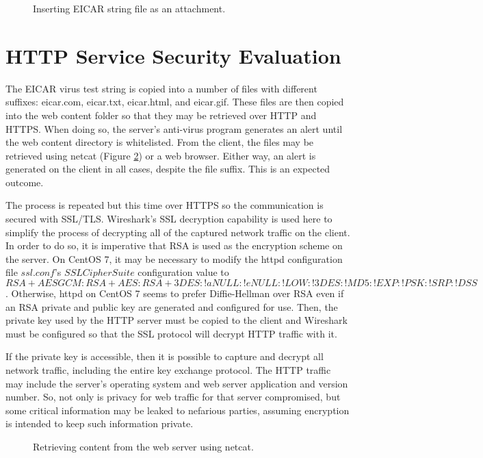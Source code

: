 \documentclass[10pt,conference]{IEEEtran}
\begin{document}
\begin{figure}
\begin{mdframed}

\caption{Inserting EICAR string file as an attachment.}
\label{fig:attachment}
\end{mdframed}
\end{figure}

\section{HTTP Service Security Evaluation}
The EICAR virus test string is copied into a number of files with different suffixes: eicar.com, 
eicar.txt, eicar.html, and eicar.gif. These files are then copied into the web content folder so
that they may be retrieved over HTTP and HTTPS. When doing so, the server's anti-virus 
program generates an alert until the web content directory is whitelisted. From the client, the files may be retrieved
using netcat (Figure \ref{fig:httpnetcat}) or a web browser.  Either way, an alert is generated on the client in all cases, despite
the file suffix.  This is an expected outcome.

The process is repeated but this time over HTTPS so the communication is secured with SSL/TLS.
Wireshark's SSL decryption capability is used here to simplify the process of decrypting all of
the captured network traffic on the client. In order to do so, it is imperative that RSA is used
as the encryption scheme on the server. On CentOS 7, it may be necessary to modify the httpd configuration
file $ssl.conf$'s $SSLCipherSuite$ configuration value to $RSA+AESGCM:RSA+AES:RSA+3DES:!aNULL:!eNULL:!LOW:!3DES:!MD5:!EXP:!PSK:!SRP:!DSS$.
Otherwise, httpd on CentOS 7 seems to prefer Diffie-Hellman over RSA even if an RSA private and public
key are generated and configured for use. Then, the private key used by the HTTP server must be copied 
to the client and Wireshark must be configured so that the SSL protocol will decrypt HTTP traffic with it.

If the private key is accessible, then it is possible to capture and decrypt all network traffic, including the entire key exchange protocol.
The HTTP traffic may include the server's operating system and web server application and version number. So, not only
is privacy for web traffic for that server compromised, but some critical information may be leaked to nefarious parties, 
assuming encryption is intended to keep such information private.

\begin{figure}
\begin{mdframed}

\caption{Retrieving content from the web server using netcat.}
\label{fig:httpnetcat}
\end{mdframed}
\end{figure}
\end{document}

